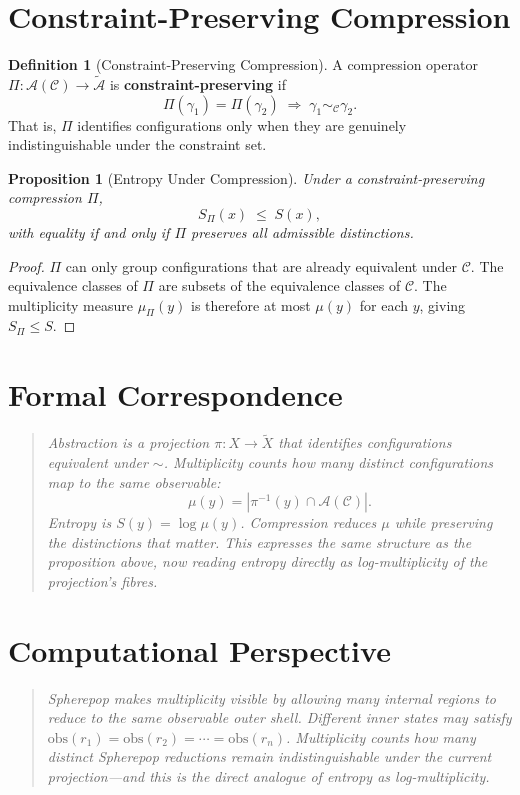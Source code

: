 \documentclass[11pt]{book}
\theoremstyle{plain}
\newtheorem{proposition}[theorem]{Proposition}
\theoremstyle{definition}
\newtheorem{definition}[theorem]{Definition}
\theoremstyle{remark}
\newcommand{\C}{\mathcal{C}}
\newcommand{\A}{\mathcal{A}}
\newcommand{\Ss}{S}
\newenvironment{formalcorrespondence}
  {\begin{quote}\small\itshape}
  {\end{quote}}
\newenvironment{computationalaside}
  {\begin{quote}\small\itshape}
  {\end{quote}}
\begin{document}
\section{Constraint-Preserving Compression}

\begin{definition}[Constraint-Preserving Compression]
A compression operator $\Pi : \A(\C) \to \tilde{\A}$ is
\textbf{constraint-preserving} if
\[
  \Pi(\gamma_1) = \Pi(\gamma_2) \;\Rightarrow\;
  \gamma_1 \sim_\C \gamma_2.
\]
That is, $\Pi$ identifies configurations only when they are genuinely
indistinguishable under the constraint set.
\end{definition}

\begin{proposition}[Entropy Under Compression]
Under a constraint-preserving compression $\Pi$,
\[
  \Ss_\Pi(x) \;\leq\; \Ss(x),
\]
with equality if and only if $\Pi$ preserves all admissible distinctions.
\end{proposition}

\begin{proof}
$\Pi$ can only group configurations that are already equivalent under $\C$.
The equivalence classes of $\Pi$ are subsets of the equivalence classes
of $\C$. The multiplicity measure $\mu_\Pi(y)$ is therefore at most
$\mu(y)$ for each $y$, giving $\Ss_\Pi \leq \Ss$.
\end{proof}

\section*{Formal Correspondence}
\begin{formalcorrespondence}
Abstraction is a projection $\pi : X \to \tilde{X}$ that identifies
configurations equivalent under $\sim$. Multiplicity counts how many
distinct configurations map to the same observable:
\[
  \mu(y) = |\pi^{-1}(y) \cap \A(\C)|.
\]
Entropy is $S(y) = \log \mu(y)$. Compression reduces $\mu$ while
preserving the distinctions that matter. This expresses the same
structure as the proposition above, now reading entropy directly as
log-multiplicity of the projection's fibres.
\end{formalcorrespondence}

\section*{Computational Perspective}
\begin{computationalaside}
Spherepop makes multiplicity visible by allowing many internal regions
to reduce to the same observable outer shell. Different inner states may
satisfy $\mathrm{obs}(r_1) = \mathrm{obs}(r_2) = \cdots = \mathrm{obs}(r_n)$.
Multiplicity counts how many distinct Spherepop reductions remain
indistinguishable under the current projection---and this is the direct
analogue of entropy as log-multiplicity.
\end{computationalaside}
\end{document}
